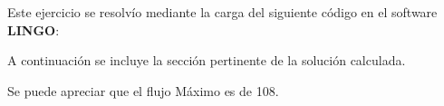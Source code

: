 \begin{homeworkProblem}

Este ejercicio se resolvío mediante la carga del siguiente código en el software \textbf{LINGO}:


A continuación se incluye la sección pertinente de la solución calculada.


Se puede apreciar que el flujo Máximo es de 108.
\end{homeworkProblem}